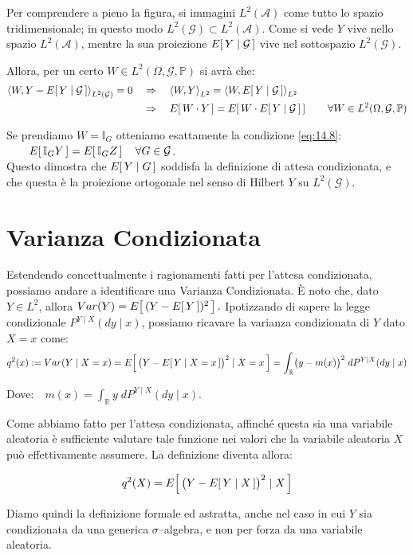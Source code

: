 Per comprendere a pieno la figura, si immagini $L^2(\mathcal{A})$ come tutto lo spazio tridimensionale; in questo modo $L^2(\mathcal{G})\subset L^2(\mathcal{A})$. Come si vede $Y$ vive nello spazio $L^2(\mathcal{A})$, mentre la sua proiezione $E\!\left[\,Y\mid \mathcal{G}\,\right]$ vive nel sottospazio $L^2(\mathcal{G})$.

\medskip
\noindent Allora, per un certo $W\in L^2(\Omega, \mathcal{G},\mathbb{P})$ si avrà che:
\begin{align*}
    \left\langle W, Y - E\!\left[\,Y\mid \mathcal{G}\,\right] \right\rangle_{L^2(\mathcal{G})} = 0 \quad &\Rightarrow\quad \left\langle W, Y\right\rangle_{L^2} = \left\langle W, E\!\left[\,Y\mid \mathcal{G}\,\right] \right\rangle_{L^2}\\
    &\Rightarrow\quad E\!\left[\,W\cdot Y\,\right] = E\!\left[\,W\cdot E\!\left[\,Y\mid \mathcal{G}\,\right]\,\right] \qquad \forall W\in L^2(\Omega, \mathcal{G},\mathbb{P})
\end{align*}

\noindent Se prendiamo $W = \mathbb{I}_G$ otteniamo esattamente la condizione \eqref{eq:14.8}: $\qquad E\!\left[\,\mathbb{I}_G Y\,\right] = E\!\left[\,\mathbb{I}_G Z\,\right]\quad \forall G\in \mathcal{G}$. \\
Questo dimostra che $E\!\left[\,Y\mid G\,\right]$ soddisfa la definizione di attesa condizionata, e che questa è la proiezione ortogonale nel senso di Hilbert $Y$ su $L^2(\mathcal{G})$.

\section{Varianza Condizionata}
Estendendo concettualmente i ragionamenti fatti per l'attesa condizionata, possiamo andare a identificare una Varianza Condizionata. È noto che, dato $Y\in L^2$, allora $Var(Y) = E\!\left[\,(Y-E\!\left[\,Y\,\right])^2\,\right].$ Ipotizzando di sapere la legge condizionale $P^{Y\mid X}(dy\mid x)$, possiamo ricavare la varianza condizionata di $Y$ dato $X=x$ come:
\[q^2(x) := Var(Y\mid X=x) = E\!\left[\,\bigl(Y-E\!\left[\,Y\mid X=x\,\right]\bigr)^2\mid X=x\,\right] = \int_\mathbb{R}\bigl(y-m(x)\bigr)^2\;dP^{Y\mid X}(dy\mid x)\]

\noindent Dove:\(\quad m(x) = \int_\mathbb{R}y\;dP^{Y\mid X}(dy\mid x)\).

\medskip
\noindent Come abbiamo fatto per l'attesa condizionata, affinché questa sia una variabile aleatoria è sufficiente valutare tale funzione nei valori che la variabile aleatoria $X$ può effettivamente assumere. La definizione diventa allora:

\[q^2(X) = E\!\left[\,\bigl(Y-E\!\left[\,Y\mid X\,\right]\bigr)^2\mid X\,\right]\]

\bigskip
\noindent Diamo quindi la definizione formale ed astratta, anche nel caso in cui $Y$ sia condizionata da una generica $\sigma$--algebra, e non per forza da una variabile aleatoria.

